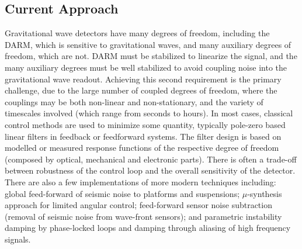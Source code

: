 \subsection{Current Approach}
Gravitational wave detectors have many degrees of freedom,  including the  \ac{DARM}, which is sensitive to gravitational waves, and many auxiliary degrees of freedom, which are not. \ac{DARM} must be stabilized to linearize the signal, and the many auxiliary degrees must be well stabilized to avoid coupling noise into the gravitational wave readout. Achieving this second requirement is the primary challenge, due to the large number of coupled degrees of freedom, where the couplings may be both non-linear and non-stationary, and the variety of timescales involved (which range from seconds to hours).
In most cases, classical control methods are used to minimize some quantity, typically pole-zero based linear filters in feedback or feedforward systems.
The filter design is based on modelled or measured response functions of the respective degree of freedom (composed by optical, mechanical and electronic parts). There is often a trade-off between robustness of the control loop and the overall sensitivity of the detector.
There are also a few implementations of more modern techniques including:
global feed-forward of seismic noise to platforms and suspensions; $\mu$-synthesis approach for limited angular control; feed-forward sensor noise subtraction (removal of seismic noise from wave-front sensors); and parametric instability damping by phase-locked loops and damping through aliasing of high frequency signals.

